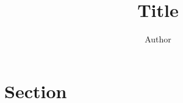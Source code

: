 \documentclass{article}
\title{Title}
\author{Author}
\date{}
\begin{document}
\maketitle

\section{Section}
\end{document}

